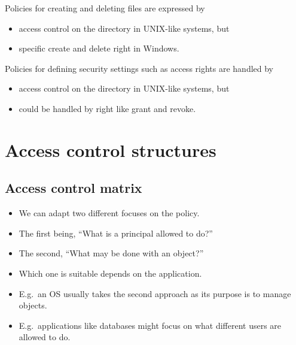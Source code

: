 \begin{frame}
  \begin{example}
    Policies for creating and deleting files are expressed by
    \begin{itemize}
      \item access control on the directory in UNIX-like systems, but
      \item specific create and delete right in Windows.
    \end{itemize}
  \end{example}

  \pause{}

  \begin{example}
    Policies for defining security settings such as access rights are handled 
    by
    \begin{itemize}
      \item access control on the directory in UNIX-like systems, but
      \item could be handled by right like grant and revoke.
    \end{itemize}
  \end{example}
\end{frame}


\section{Access control structures}

\subsection{Access control matrix}

\begin{frame}
  \begin{itemize}
    \item We can adapt two different focuses on the policy.

    \item The first being, ``What is a principal allowed to do?''

    \item The second, ``What may be done with an object?''

      \pause{}

    \item Which one is suitable depends on the application.

    \item E.g.\ an OS usually takes the second approach as its purpose is to 
      manage objects.

    \item E.g.\ applications like databases might focus on what different users 
      are allowed to do.
  \end{itemize}
\end{frame}


